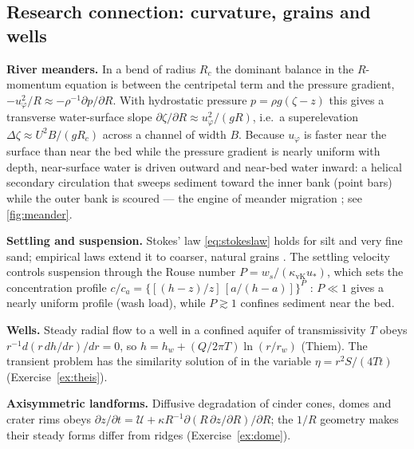 \documentclass[11pt,letterpaper]{article}
\numberwithin{equation}{section}
\newcommand{\Up}{\mathcal{U}}
\begin{document}
\subsection{Research connection: curvature, grains and wells}
\begin{research}
\textbf{River meanders.} In a bend of radius $R_c$ the dominant balance in the $R$-momentum equation is between the centripetal term
and the pressure gradient, $-u_\varphi^2/R\approx-\rho^{-1}\partial p/\partial R$. With hydrostatic pressure $p=\rho g(\zeta-z)$ this gives a
transverse water-surface slope $\partial\zeta/\partial R\approx u_\varphi^2/(gR)$, i.e.\ a superelevation $\Delta\zeta\approx U^2B/(gR_c)$ across a channel
of width $B$. Because $u_\varphi$ is faster near the surface than near the bed while the pressure gradient is nearly uniform with depth,
near-surface water is driven outward and near-bed water inward: a helical secondary circulation \citep{rozovskii1957} that sweeps
sediment toward the inner bank (point bars) while the outer bank is scoured --- the engine of meander migration
\citep{ikeda1981,seminara2006}; see \cref{fig:meander}.

\textbf{Settling and suspension.} Stokes' law \eqref{eq:stokeslaw} holds for silt and very fine sand; empirical laws extend it to
coarser, natural grains \citep{dietrich1982,ferguson2004}. The settling velocity controls suspension through the Rouse number
$P=w_s/(\kappa_{\mathrm{vK}}u_*)$, which sets the concentration profile $c/c_a=\{[(h-z)/z]\,[a/(h-a)]\}^{P}$ \citep{rouse1937}:
$P\ll1$ gives a nearly uniform profile (wash load), while $P\gtrsim1$ confines sediment near the bed.

\textbf{Wells.} Steady radial flow to a well in a confined aquifer of transmissivity $T$ obeys $r^{-1}d(r\,dh/dr)/dr=0$, so
$h=h_w+(Q/2\pi T)\ln(r/r_w)$ (Thiem). The transient problem has the similarity solution of \citet{theis1935} in the variable
$\eta=r^2S/(4Tt)$ (Exercise~\ref{ex:theis}).

\textbf{Axisymmetric landforms.} Diffusive degradation of cinder cones, domes and crater rims obeys
$\partial z/\partial t=\Up+\kappa R^{-1}\partial(R\,\partial z/\partial R)/\partial R$; the $1/R$ geometry makes their steady forms differ from ridges
(Exercise~\ref{ex:dome}).
\end{research}
\end{document}
